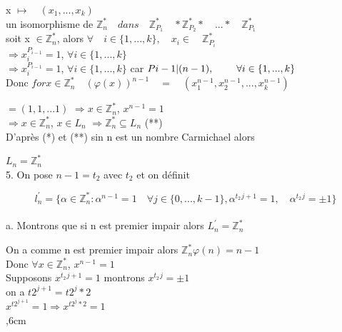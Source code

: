 \documentclass[10pt]{beamer}
\begin{document}
\begin{frame}

x \quad $ \mapsto \quad (x_1,...,x_k)$\\
 un isomorphisme de $\mathbb{Z}_n^* \quad dans \quad \mathbb{Z}_{{P}_{1}}^{*} \quad *\mathbb{Z}_{{P}_{2}}^{*} * \quad ... *\quad \mathbb{Z}_{{P}_{1}}^{*}$ \\

soit x $ \in  \mathbb{Z}_n^*$, alors $ \forall \quad i \in \{1,...,k\}, \quad x_i \in \quad \mathbb{Z}_{{P}_{i}}^{*}$\\

$\Longrightarrow x_i^{P_{i-1}} =1 $, $ \forall i \in \{1,...,k\}$\\

$\Longrightarrow x_i^{P_{i-1}} =1 $, $ \forall i \in \{1,...,k\}$ car $ P{i-1} \Huge{\mid} (n-1),\quad \forall i \in \{1,...,k\}$\\
Donc $ for x \in \mathbb{Z}_n^* \quad (\varphi(x))^{n-1} \quad =\quad (x_1^{n-1},x_2^{n-1},...,x_k^{n-1})$


$ =(1,1,...1)$
$\Longrightarrow x \in \mathbb{Z}_n^*$, $ x^{n-1}=1$\\
$\Longrightarrow x \in \mathbb{Z}_n^*$, $ x \in L_n$
$\Longrightarrow \mathbb{Z}_n^* \subseteq L_n$ \hfill(**)\\

D'apr\`es (*) et (**) sin n est un nombre Carmichael alors

$L_n = \mathbb{Z}_n^*$\\

5. On pose $ n-1 = t_2$  avec $t_2$ et on d\'efinit

$$
l^{'}_n  =  \{ \alpha \in
\mathbb{Z}_n^* :  \alpha^{n-1}  = 1 \quad \forall j \in \{0,...,k-1\}, \alpha^{t_2}{^{j+1}}=1,\quad \alpha^{t_2}{^{j}}= \pm 1  \}
$$\\

a. Montrons que si n est premier impair alors $ L^{'}_n = \mathbb{Z}_n^*$

On a comme n est premier impair alors $\mathbb{Z}_n^{*} \varphi(n) = n-1$\\
Donc $\forall x \in \mathbb{Z}_n^*$, $ x^{n-1}=1$\\
Supposons $ x^{t_2}{^{j+1}}=1$ montrons $ x^{t_2}{^{j}}= \pm 1 $\\
on a $t2^{j+1}= t2^{j} *2$\\
$ x^{t2^{j+1}}= 1 \Longrightarrow  x^{t2^{j}*2}=1$\\
,6cm

\end{frame}
\end{document}
